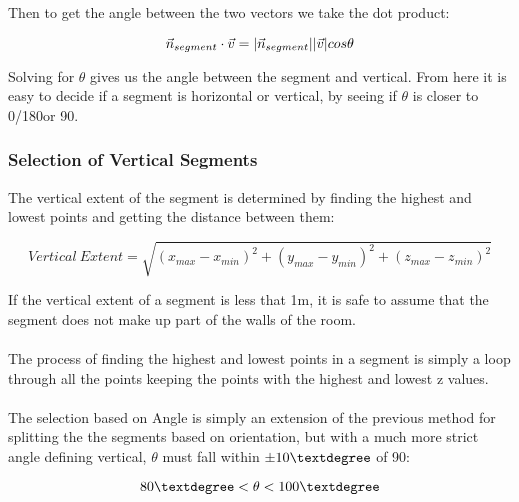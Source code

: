 			Then to get the angle between the two vectors we take the dot product:
			
			\begin{equation}
			\vec{n}_{segment}\cdot \vec{v} = \lvert \vec{n}_{segment} \rvert \lvert \vec{v} \rvert cos \theta
			\end{equation}
			
			Solving for $\theta$ gives us the angle between the segment and vertical. From here it is easy to decide if a segment is horizontal or vertical, by seeing if $\theta$ is closer to 0\textdegree/180\textdegree or 90\textdegree.
			
		\subsubsection{Selection of Vertical Segments}
			
			The vertical extent of the segment is determined by finding the highest and lowest points and getting the distance between them:
			
			\begin{equation}
			Vertical \: Extent = \sqrt{(x_{max} - x_{min})^2+(y_{max} - y_{min})^2+(z_{max} - z_{min})^2}
			\end{equation}
			
			If the vertical extent of a segment is less that 1m, it is safe to assume that the segment does not make up part of the walls of the room.\\
			\\
			The process of finding the highest and lowest points in a segment is simply a loop through all the points keeping the points with the highest and lowest z values.\\
			\\
			The selection based on Angle is simply an extension of the previous method for splitting the the segments based on orientation, but with a much more strict angle defining vertical, $\theta$ must fall within $\pm 10\textdegree$ of 90\textdegree:
			
			\begin{equation}
			80\textdegree < \theta < 100\textdegree
			\end{equation}
			
			
					
